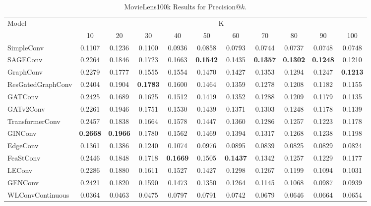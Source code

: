 \documentclass[bst/sn-nature]{sn-jnl}
\begin{document}
\begin{appendices}
\begin{table}[htbp]
    \centering 
    \begin{tabular}{|l|*{10}{c|}}
    \hline
    \multirow{2}{*}{Model} & \multicolumn{10}{c|}{K} \\
    \hhline{~*{10}{|-}|}
                             & 10    & 20    & 30    & 40    & 50    & 60    & 70    & 80    & 90    & 100   \\ \hline
    \rowcolor[gray]{0.9} SimpleConv               & 0.1107 & 0.1236 & 0.1100 & 0.0936 & 0.0858 & 0.0793 & 0.0744 & 0.0737 & 0.0748 & 0.0748 \\ 
    SAGEConv                 & 0.2264 & 0.1846 & 0.1723 & 0.1663 & \textbf{0.1542} & 0.1435 & \textbf{0.1357} & \textbf{0.1302} & \textbf{0.1248} & 0.1210 \\ 
    \rowcolor[gray]{0.9} GraphConv                & 0.2279 & 0.1777 & 0.1555 & 0.1554 & 0.1470 & 0.1427 & 0.1353 & 0.1294 & 0.1247 & \textbf{0.1213} \\ 
    ResGatedGraphConv        & 0.2404 & 0.1904 & \textbf{0.1783} & 0.1600 & 0.1464 & 0.1359 & 0.1278 & 0.1208 & 0.1182 & 0.1155 \\ 
    \rowcolor[gray]{0.9} GATConv                  & 0.2425 & 0.1689 & 0.1625 & 0.1512 & 0.1419 & 0.1352 & 0.1288 & 0.1209 & 0.1179 & 0.1135 \\ 
    GATv2Conv                & 0.2261 & 0.1946 & 0.1751 & 0.1530 & 0.1439 & 0.1371 & 0.1303 & 0.1248 & 0.1178 & 0.1139 \\ 
    \rowcolor[gray]{0.9} TransformerConv          & 0.2457 & 0.1838 & 0.1664 & 0.1578 & 0.1447 & 0.1360 & 0.1286 & 0.1257 & 0.1223 & 0.1178 \\ 
    GINConv                  & \textbf{0.2668} & \textbf{0.1966} & 0.1780 & 0.1562 & 0.1469 & 0.1394 & 0.1317 & 0.1268 & 0.1238 & 0.1198 \\ 
    \rowcolor[gray]{0.9} EdgeConv                 & 0.1361 & 0.1386 & 0.1240 & 0.1074 & 0.0976 & 0.0895 & 0.0839 & 0.0825 & 0.0829 & 0.0824 \\ 
    FeaStConv                & 0.2446 & 0.1848 & 0.1718 & \textbf{0.1669} & 0.1505 & \textbf{0.1437} & 0.1342 & 0.1257 & 0.1229 & 0.1177 \\ 
    \rowcolor[gray]{0.9} LEConv                   & 0.2286 & 0.1880 & 0.1611 & 0.1527 & 0.1427 & 0.1298 & 0.1267 & 0.1199 & 0.1094 & 0.1031 \\ 
    GENConv                  & 0.2421 & 0.1820 & 0.1590 & 0.1473 & 0.1350 & 0.1264 & 0.1145 & 0.1068 & 0.0987 & 0.0939 \\ 
    \rowcolor[gray]{0.9} WLConvContinuous         & 0.0364 & 0.0463 & 0.0475 & 0.0797 & 0.0791 & 0.0742 & 0.0679 & 0.0646 & 0.0664 & 0.0654 \\ \hline
    \end{tabular}
    \caption{MovieLens100k Results for Precision@$k$.}
    \label{tab:precision}
\end{table}


\end{appendices}
\end{document}
